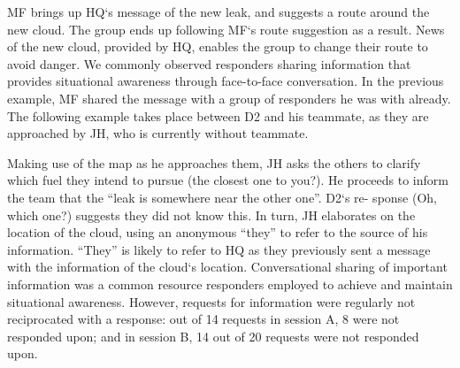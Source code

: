 MF brings up HQ`s message of the new leak, and suggests a route around the new cloud. The group ends up following MF`s route suggestion as a result. News of the new cloud, provided by HQ, enables the group to change their route to avoid danger. We commonly observed responders sharing information that provides situational awareness through face-to-face conversation. In the previous example, MF shared the message with a group of responders he was with already. The following example takes place between D2 and his teammate, as they are approached by JH, who is currently without teammate.\\

\noindent{} 


Making use of the map as he approaches them, JH asks the others to clarify which fuel they intend to pursue (the closest one to you?). He proceeds to inform the team that the ``leak is somewhere near the other one''. D2`s re- sponse (Oh, which one?) suggests they did not know this. In turn, JH elaborates on the location of the cloud, using an anonymous ``they'' to refer to the source of his information. ``They'' is likely to refer to HQ as they previously sent a message with the information of the cloud`s location. Conversational sharing of important information was a common resource responders employed to achieve and maintain situational awareness. However, requests for information were regularly not reciprocated with a response: out of 14 requests in session A, 8 were not responded upon; and in session B, 14 out of 20 requests were not responded upon.\\






